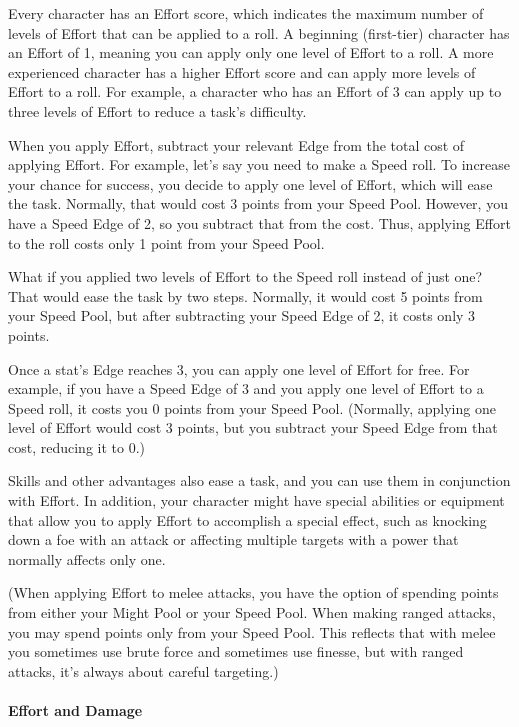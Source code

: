 \begin{multicols}{2}
Every character has an Effort score, which indicates the maximum number of levels of Effort that can be applied to a roll. A beginning (first-tier) character has an Effort of 1, meaning you can apply only one level of Effort to a roll. A more experienced character has a higher Effort score and can apply more levels of Effort to a roll. For example, a character who has an Effort of 3 can apply up to three levels of Effort to reduce a task’s difficulty.

When you apply Effort, subtract your relevant Edge from the total cost of applying Effort. For example, let’s say you need to make a Speed roll. To increase your chance for success, you decide to apply one level of Effort, which will ease the task. Normally, that would cost 3 points from your Speed Pool. However, you have a Speed Edge of 2, so you subtract that from the cost. Thus, applying Effort to the roll costs only 1 point from your Speed Pool.

What if you applied two levels of Effort to the Speed roll instead of just one? That would ease the task by two steps. Normally, it would cost 5 points from your Speed Pool, but after subtracting your Speed Edge of 2, it costs only 3 points.

Once a stat’s Edge reaches 3, you can apply one level of Effort for free. For example, if you have a Speed Edge of 3 and you apply one level of Effort to a Speed roll, it costs you 0 points from your Speed Pool. (Normally, applying one level of Effort would cost 3 points, but you subtract your Speed Edge from that cost, reducing it to 0.)

Skills and other advantages also ease a task, and you can use them in conjunction with Effort. In addition, your character might have special abilities or equipment that allow you to apply Effort to accomplish a special effect, such as knocking down a foe with an attack or affecting multiple targets with a power that normally affects only one.

(When applying Effort to melee attacks, you have the option of spending points from either your Might Pool or your Speed Pool. When making ranged attacks, you may spend points only from your Speed Pool. This reflects that with melee you sometimes use brute force and sometimes use finesse, but with ranged attacks, it’s always about careful targeting.)

\paragraph{Effort and Damage}


\end{multicols}
